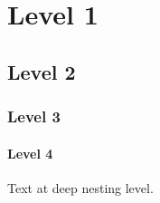 \documentclass{article}
\begin{document}
\section{Level 1}
\subsection{Level 2}
\subsubsection{Level 3}
\paragraph{Level 4}
Text at deep nesting level.
\end{document}
